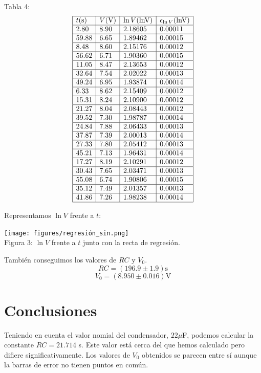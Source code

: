 \documentclass{article}
\begin{document}
\begin{multicols}{2}
\begin{center}
  Tabla 4:
  $$
  \begin{array}{|l|l|l|l|} \hline
    t\text{(s)} & V\text{(V)} & \ln V\text{(lnV)} & \epsilon_{\ln V}\text{(lnV)} \\ \hline
     2.80 & 8.90 & 2.18605 & 0.00011  \\ \hline
    59.88 & 6.65 & 1.89462 & 0.00015  \\ \hline
     8.48 & 8.60 & 2.15176 & 0.00012  \\ \hline
    56.62 & 6.71 & 1.90360 & 0.00015  \\ \hline
    11.05 & 8.47 & 2.13653 & 0.00012  \\ \hline
    32.64 & 7.54 & 2.02022 & 0.00013  \\ \hline
    49.24 & 6.95 & 1.93874 & 0.00014  \\ \hline
     6.33 & 8.62 & 2.15409 & 0.00012  \\ \hline
    15.31 & 8.24 & 2.10900 & 0.00012  \\ \hline
    21.27 & 8.04 & 2.08443 & 0.00012  \\ \hline
    39.52 & 7.30 & 1.98787 & 0.00014  \\ \hline
    24.84 & 7.88 & 2.06433 & 0.00013  \\ \hline
    37.87 & 7.39 & 2.00013 & 0.00014  \\ \hline
    27.33 & 7.80 & 2.05412 & 0.00013  \\ \hline
    45.21 & 7.13 & 1.96431 & 0.00014  \\ \hline
    17.27 & 8.19 & 2.10291 & 0.00012  \\ \hline
    30.43 & 7.65 & 2.03471 & 0.00013  \\ \hline
    55.08 & 6.74 & 1.90806 & 0.00015  \\ \hline
    35.12 & 7.49 & 2.01357 & 0.00013  \\ \hline
    41.86 & 7.26 & 1.98238 & 0.00014  \\ \hline
    \end{array}
  $$
\end{center}
Representamos $\ln V$ frente a $t$:
\begin{center}
  \texttt{[image: figures/regresión\_sin.png]}\\
  Figura 3: $\ln V$ frente a $t$ junto con la recta de regresión.
\end{center}
También conseguimos los valores de $RC$ y $V_0$.
$$
RC = ( 196.9 \pm 1.9 ) \text{s}
$$
$$
V_0 = ( 8.950\pm 0.016 ) \text{V}
$$
\section*{Conclusiones}
Teniendo en cuenta el valor nomial del condensador, $22\mu$F, podemos calcular la constante $RC=21.714$ s. Este valor está cerca del que hemos calculado pero difiere significativamente. Los valores de $V_0$ obtenidos se parecen entre sí aunque la barras de error no tienen puntos en común.
\begin{thebibliography}{1}


\end{thebibliography}
\end{multicols}
\end{document}
